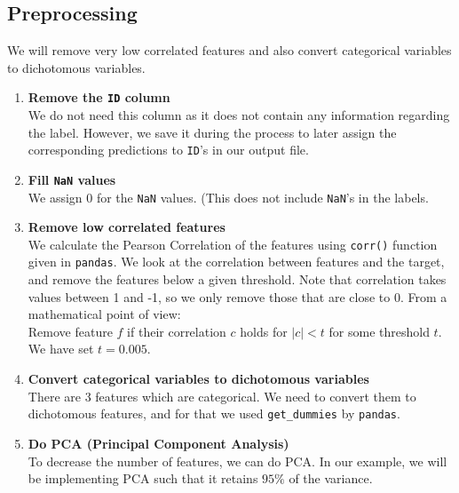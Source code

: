 \documentclass[11pt,reqno]{amsart}
\newcommand{\code}[1]{\texttt{#1}}
\begin{document}
\subsection{Preprocessing}
We will remove very low correlated features and also convert categorical variables to dichotomous variables.
\begin{enumerate}
	\item \textbf{Remove the \code{ID} column} \\
	We do not need this column as it does not contain any information regarding the label. However, we save it during the process to later assign the corresponding predictions to \code{ID}'s in our output file.
	\item \textbf{Fill \code{NaN} values} \\
	We assign 0 for the \code{NaN} values. (This does not include \code{NaN}'s in the labels.
	\item \textbf{Remove low correlated features} \\
	We calculate the Pearson Correlation of the features using \code{corr()} function given in \code{pandas}. We look at the correlation between features and the target, and remove the features below a given threshold. Note that correlation takes values between 1 and -1, so we only remove those that are close to 0. From a mathematical point of view: \\
	Remove feature $f$ if their correlation $c$ holds for $|c|<t$ for some threshold $t$. We have set $t=0.005$. \\
	\item \textbf{Convert categorical variables to dichotomous variables} \\
	There are 3 features which are categorical. We need to convert them to dichotomous features, and for that we used \code{get\_dummies} by \code{pandas}.
	\item \textbf{Do PCA (Principal Component Analysis)} \\
	To decrease the number of features, we can do PCA. In our example, we will be implementing PCA such that it retains $95\%$ of the variance.
\end{enumerate}
\end{document}
